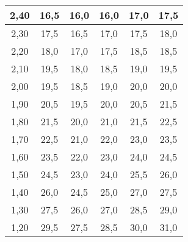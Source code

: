 \documentclass[a4paper,12pt,spanish]{article}
\begin{document}
\begin{longtable}[c]{c|ccccc|}
			\multicolumn{1}{|c|}{2,40} & \multicolumn{1}{c|}{16,5}   & \multicolumn{1}{c|}{16,0} & \multicolumn{1}{c|}{16,0} & \multicolumn{1}{c|}{17,0} & 17,5 \\ \hline
			\multicolumn{1}{|c|}{2,30} & \multicolumn{1}{c|}{17,5}   & \multicolumn{1}{c|}{16,5} & \multicolumn{1}{c|}{17,0} & \multicolumn{1}{c|}{17,5} & 18,0 \\ \hline
			\multicolumn{1}{|c|}{2,20} & \multicolumn{1}{c|}{18,0}   & \multicolumn{1}{c|}{17,0} & \multicolumn{1}{c|}{17,5} & \multicolumn{1}{c|}{18,5} & 18,5 \\ \hline
			\multicolumn{1}{|c|}{2,10} & \multicolumn{1}{c|}{19,5}   & \multicolumn{1}{c|}{18,0} & \multicolumn{1}{c|}{18,5} & \multicolumn{1}{c|}{19,0} & 19,5 \\ \hline
			\multicolumn{1}{|c|}{2,00} & \multicolumn{1}{c|}{19,5}   & \multicolumn{1}{c|}{18,5} & \multicolumn{1}{c|}{19,0} & \multicolumn{1}{c|}{20,0} & 20,0 \\ \hline
			\multicolumn{1}{|c|}{1,90} & \multicolumn{1}{c|}{20,5}   & \multicolumn{1}{c|}{19,5} & \multicolumn{1}{c|}{20,0} & \multicolumn{1}{c|}{20,5} & 21,5 \\ \hline
			\multicolumn{1}{|c|}{1,80} & \multicolumn{1}{c|}{21,5}   & \multicolumn{1}{c|}{20,0} & \multicolumn{1}{c|}{21,0} & \multicolumn{1}{c|}{21,5} & 22,5 \\ \hline
			\multicolumn{1}{|c|}{1,70} & \multicolumn{1}{c|}{22,5}   & \multicolumn{1}{c|}{21,0} & \multicolumn{1}{c|}{22,0} & \multicolumn{1}{c|}{23,0} & 23,5 \\ \hline
			\multicolumn{1}{|c|}{1,60} & \multicolumn{1}{c|}{23,5}   & \multicolumn{1}{c|}{22,0} & \multicolumn{1}{c|}{23,0} & \multicolumn{1}{c|}{24,0} & 24,5 \\ \hline
			\multicolumn{1}{|c|}{1,50} & \multicolumn{1}{c|}{24,5}   & \multicolumn{1}{c|}{23,0} & \multicolumn{1}{c|}{24,0} & \multicolumn{1}{c|}{25,5} & 26,0 \\ \hline
			\multicolumn{1}{|c|}{1,40} & \multicolumn{1}{c|}{26,0}   & \multicolumn{1}{c|}{24,5} & \multicolumn{1}{c|}{25,0} & \multicolumn{1}{c|}{27,0} & 27,5 \\ \hline
			\multicolumn{1}{|c|}{1,30} & \multicolumn{1}{c|}{27,5}   & \multicolumn{1}{c|}{26,0} & \multicolumn{1}{c|}{27,0} & \multicolumn{1}{c|}{28,5} & 29,0 \\ \hline
			\multicolumn{1}{|c|}{1,20} & \multicolumn{1}{c|}{29,5}   & \multicolumn{1}{c|}{27,5} & \multicolumn{1}{c|}{28,5} & \multicolumn{1}{c|}{30,0} & 31,0 \\ \hline

\end{longtable}
\end{document}
